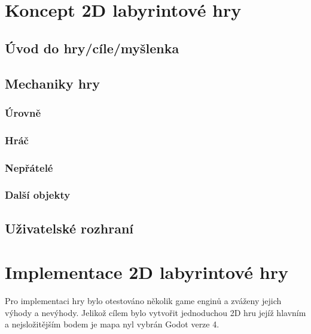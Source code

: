 \chapter{Koncept 2D labyrintové hry}
    
\section{Úvod do hry/cíle/myšlenka}
\section{Mechaniky hry}
\subsection*{Úrovně}
\subsection*{Hráč}
\subsection*{Nepřátelé}
\subsection*{Další objekty}
 
\section{Uživatelské rozhraní}

\chapter{Implementace 2D labyrintové hry} %
Pro implementaci hry bylo otestováno několik game enginů a zváženy jejich výhody a nevýhody. Jelikož cílem bylo vytvořit jednoduchou 2D hru jejíž hlavním a nejsložitějším bodem je mapa nyl vybrán Godot verze 4. 

